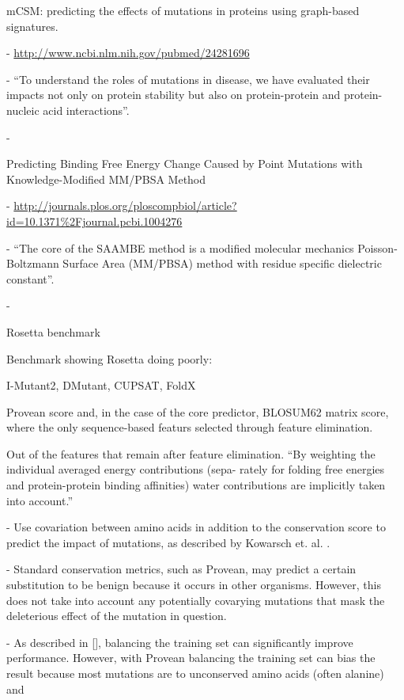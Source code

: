 mCSM: predicting the effects of mutations in proteins using graph-based signatures.

  - \url{http://www.ncbi.nlm.nih.gov/pubmed/24281696}

  - ``To understand the roles of mutations in disease, we have evaluated their impacts not only on protein stability but also on protein-protein and protein-nucleic acid interactions''.

  - \cite{pires_mcsm:_2014}


Predicting Binding Free Energy Change Caused by Point Mutations with Knowledge-Modified MM/PBSA Method

  - \url{http://journals.plos.org/ploscompbiol/article?id=10.1371%2Fjournal.pcbi.1004276}

  - ``The core of the SAAMBE method is a modified molecular mechanics Poisson-Boltzmann Surface Area (MM/PBSA) method with residue specific dielectric constant''.

  - \cite{petukh_predicting_2015}




Rosetta benchmark \cite{o_conchuir_web_2015}

Benchmark showing Rosetta doing poorly: \cite{potapov_assessing_2009}

I-Mutant2, DMutant, CUPSAT, FoldX \cite{khan_performance_2010}


Provean score and, in the case of the core predictor, BLOSUM62 matrix score, where the only sequence-based featurs selected through feature elimination.

Out of the features that remain after feature elimination.
``By weighting the individual averaged energy contributions (sepa-
rately for folding free energies and protein-protein binding affinities)
water contributions are implicitly taken into account.''


- Use covariation between amino acids in addition to the conservation score to predict the impact of mutations, as described by Kowarsch et. al. \cite{kowarsch_correlated_2010}.

- Standard conservation metrics, such as Provean, may predict a certain substitution to be benign because it occurs in other organisms. However, this does not take into account any potentially covarying mutations that mask the deleterious effect of the mutation in question.

- As described in [], balancing the training set can significantly improve performance. However, with Provean balancing the training set can bias the result because most mutations are to unconserved amino acids (often alanine) and


